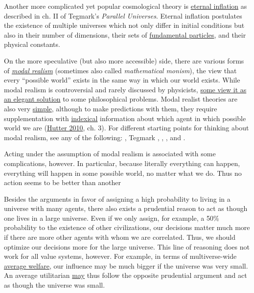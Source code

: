 Another more complicated yet popular cosmological theory is
\href{https://en.wikipedia.org/wiki/Eternal_inflation}{eternal
inflation} as described in ch. II of Tegmark's \emph{Parallel
Universes}. Eternal inflation postulates the existence of multiple
universes which not only differ in initial conditions but also in their
number of dimensions, their sets of
\href{https://en.wikipedia.org/wiki/Elementary_particle}{fundamental
particles}, and their physical constants.

On the more speculative (but also more accessible) side, there are
various forms of
\href{https://en.wikipedia.org/wiki/Modal_realism}{\emph{modal
realism}} (sometimes also called \emph{mathematical monism}), the view
that every ``possible world'' exists in the same way in which our world
exists. While modal realism is controversial and rarely discussed by
physicists,
\href{http://reducing-suffering.org/why-does-physics-exist/\#Maybe_theres_no_such_thing_as_existence}{some
view it as an elegant solution} to some philosophical problems. Modal
realist theories are also very
\href{http://lesswrong.com/lw/jp/occams_razor/}{simple}, although
to make predictions with them, they require supplementation with
\href{https://en.wikipedia.org/wiki/Indexicality\#Extensions}{indexical}
information about which agent in which possible world we are
(\href{https://arxiv.org/abs/0912.5434}{Hutter 2010}, ch. 3). For
different starting points for thinking about modal realism, see any of
the following:
\citet{Lewis1986-rk}, Tegmark \citeyear{Tegmark1998-mf}, \citeyear{Tegmark2008-sq}, \citeyear{Tegmark2014-mw}, and
\citet{Schmidhuber1997-vd}.

Acting under the assumption of modal realism is associated with some
complications, however. In particular, because literally everything can
happen, everything will happen in some possible world, no matter what we
do. Thus no action seems to be better than another~\parencite{Oesterheld2017-2}

Besides the arguments in favor of assigning a high probability to living
in a universe with many agents, there also exists a prudential reason to
act as though one lives in a large universe. Even if we only assign, for
example, a 50\% probability to the existence of other civilizations, our
decisions matter much more if there are more other agents with whom we
are correlated. Thus, we should optimize our decisions more for the
large universe. This line of reasoning does not work for all value
systems, however. For example, in terms of multiverse-wide
\href{https://en.wikipedia.org/wiki/Average_and_total_utilitarianism}{average
welfare}, our influence may be much bigger if the universe was very
small. An average utilitarian
\href{https://casparoesterheld.com/2017/03/15/the-average-utilitarians-solipsism-wager/}{may}
thus follow the opposite prudential argument and act as though the
universe was small.

